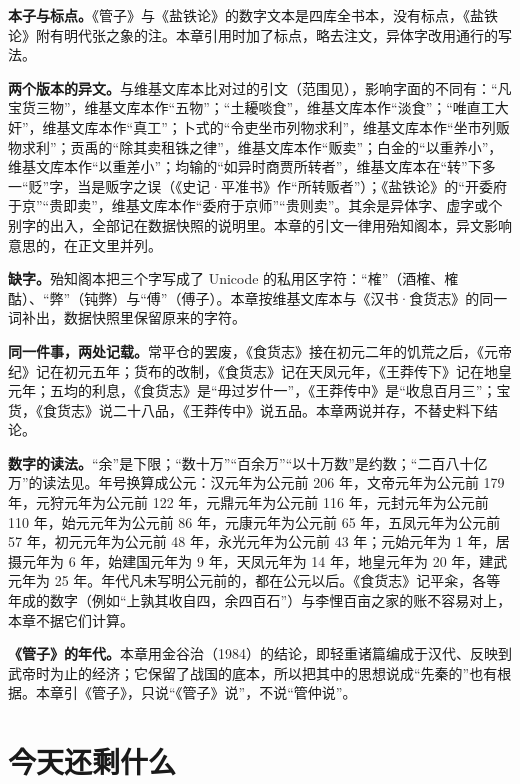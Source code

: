 \begin{deeper}[读这些史料时要注意什么]
\textbf{本子与标点。}《管子》与《盐铁论》的数字文本是四库全书本，没有标点，《盐铁论》附有明代张之象的注。本章引用时加了标点，略去注文，异体字改用通行的写法。

\textbf{两个版本的异文。}与维基文库本比对过的引文（范围见），影响字面的不同有：“凡宝货三物”，维基文库本作“五物”；“土耰啖食”，维基文库本作“淡食”；“唯直工大奸”，维基文库本作“真工”；卜式的“令吏坐市列物求利”，维基文库本作“坐市列贩物求利”；贡禹的“除其卖租铢之律”，维基文库本作“贩卖”；白金的“以重养小”，维基文库本作“以重差小”；均输的“如异时商贾所转者”，维基文库本在“转”下多一“贬”字，当是贩字之误（《史记·平准书》作“所转贩者”）；《盐铁论》的“开委府于京”“贵即卖”，维基文库本作“委府于京师”“贵则卖”。其余是异体字、虚字或个别字的出入，全部记在数据快照的说明里。本章的引文一律用殆知阁本，异文影响意思的，在正文里并列。

\textbf{缺字。}殆知阁本把三个字写成了 Unicode 的私用区字符：“榷”（酒榷、榷酤）、“弊”（钝弊）与“傅”（傅子）。本章按维基文库本与《汉书·食货志》的同一词补出，数据快照里保留原来的字符。

\textbf{同一件事，两处记载。}常平仓的罢废，《食货志》接在初元二年的饥荒之后，《元帝纪》记在初元五年；货布的改制，《食货志》记在天凤元年，《王莽传下》记在地皇元年；五均的利息，《食货志》是“毋过岁什一”，《王莽传中》是“收息百月三”；宝货，《食货志》说二十八品，《王莽传中》说五品。本章两说并存，不替史料下结论。

\textbf{数字的读法。}“余”是下限；“数十万”“百余万”“以十万数”是约数；“二百八十亿万”的读法见。年号换算成公元：汉元年为公元前 206 年，文帝元年为公元前 179 年，元狩元年为公元前 122 年，元鼎元年为公元前 116 年，元封元年为公元前 110 年，始元元年为公元前 86 年，元康元年为公元前 65 年，五凤元年为公元前 57 年，初元元年为公元前 48 年，永光元年为公元前 43 年；元始元年为 1 年，居摄元年为 6 年，始建国元年为 9 年，天凤元年为 14 年，地皇元年为 20 年，建武元年为 25 年。年代凡未写明公元前的，都在公元以后。《食货志》记平籴，各等年成的数字（例如“上孰其收自四，余四百石”）与李悝百亩之家的账不容易对上，本章不据它们计算。

\textbf{《管子》的年代。}本章用金谷治（1984）的结论，即轻重诸篇编成于汉代、反映到武帝时为止的经济；它保留了战国的底本，所以把其中的思想说成“先秦的”也有根据。本章引《管子》，只说“《管子》说”，不说“管仲说”。
\end{deeper}

\section{今天还剩什么}\label{sec:qinhan-legacy}


